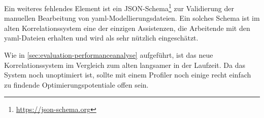 Ein weiteres fehlendes Element ist ein JSON-Schema\footnote{\url{https://json-schema.org}} zur Validierung der manuellen Bearbeitung von \acrshort{yaml}-Modellierungsdateien.
Ein solches Schema ist im alten Korrelationssystem eine der einzigen Assistenzen, die Arbeitende mit den \acrshort{yaml}-Dateien erhalten und wird als sehr nützlich eingeschätzt.

Wie in \autoref{sec:evaluation-performanceanalyse} aufgeführt, ist das neue Korrelationssystem im Vergleich zum alten langsamer in der Laufzeit.
Da das System noch unoptimiert ist, sollte mit einem Profiler noch einige recht einfach zu findende Optimierungspotentiale offen sein.
